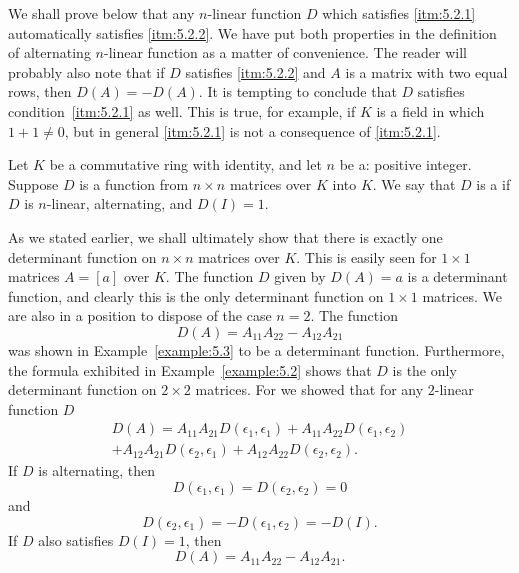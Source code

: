 We shall prove below that any \(n\)-linear function \(D\) which satisfies \ref{itm:5.2.1} automatically satisfies \ref{itm:5.2.2}. We have put both properties in the definition of alternating \(n\)-linear function as a matter of convenience. The reader will probably also note that if \(D\) satisfies \ref{itm:5.2.2} and \(A\) is a matrix with two equal rows, then \(D\left(A\right)=-D\left(A\right)\). It is tempting to conclude that \(D\) satisfies condition~\ref{itm:5.2.1} as well. This is true, for example, if \(K\) is a field in which \(1+1\ne0\), but in general \ref{itm:5.2.1} is not a consequence of \ref{itm:5.2.1}.

\begin{definition}
    Let \(K\) be a commutative ring with identity, and let \(n\) be a: positive integer. Suppose \(D\) is a function from \(n\times n\) matrices over \(K\) into \(K\). We say that \(D\) is a  if \(D\) is \(n\)-linear, alternating, and \(D\left(I\right)=1\).
\end{definition}

As we stated earlier, we shall ultimately show that there is exactly one determinant function on \(n\times n\) matrices over \(K\). This is easily seen for \(1\times1\) matrices \(A=\left[a\right]\) over \(K\). The function \(D\) given by \(D\left(A\right)=a\) is a determinant function, and clearly this is the only determinant function on \(1\times 1\) matrices. We are also in a position to dispose of the case \(n=2\). The function
\begin{equation}
    D\left(A\right)=A_{11}A_{22}-A_{12}A_{21}
\end{equation}
was shown in Example~\ref{example:5.3} to be a determinant function. Furthermore, the formula exhibited in Example~\ref{example:5.2} shows that \(D\) is the only determinant function on \(2\times2\) matrices. For we showed that for any \(2\)-linear function \(D\)
\begin{multline*}
    D\left(A\right)=A_{11}A_{21}D\left(\epsilon_1,\epsilon_1\right)+A_{11}A_{22}D\left(\epsilon_1,\epsilon_2\right)\\
    +A_{12}A_{21}D\left(\epsilon_2,\epsilon_1\right)+A_{12}A_{22}D\left(\epsilon_2,\epsilon_2\right).
\end{multline*}
If \(D\) is alternating, then
\begin{equation*}
    D\left(\epsilon_1,\epsilon_1\right)=D\left(\epsilon_2,\epsilon_2\right)=0
\end{equation*}
and
\begin{equation*}
    D\left(\epsilon_2,\epsilon_1\right)=-D\left(\epsilon_1,\epsilon_2\right)=-D\left(I\right).
\end{equation*}
If \(D\) also satisfies \(D\left(I\right)=1\), then
\begin{equation*}
    D\left(A\right)=A_{11}A_{22}-A_{12}A_{21}.
\end{equation*}

